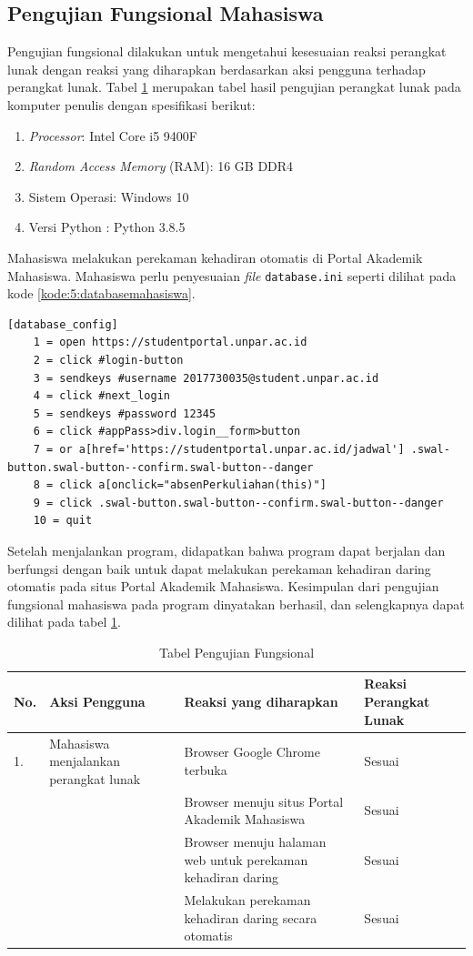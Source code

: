 \subsection{Pengujian Fungsional Mahasiswa}
Pengujian fungsional dilakukan untuk mengetahui kesesuaian reaksi perangkat lunak dengan reaksi yang diharapkan berdasarkan aksi pengguna terhadap perangkat lunak. Tabel \ref{tab:fungsiMahasiswa} merupakan tabel hasil pengujian perangkat lunak pada komputer penulis dengan spesifikasi berikut:
\begin{enumerate}
	\item \textit{Processor}: Intel Core i5 9400F
	\item \textit{Random Access Memory} (RAM): 16 GB DDR4
	\item Sistem Operasi: Windows 10
	\item Versi Python : Python 3.8.5
\end{enumerate}
Mahasiswa melakukan perekaman kehadiran otomatis di Portal Akademik Mahasiswa. Mahasiswa perlu penyesuaian \textit{file} \texttt{database.ini} seperti dilihat pada kode \ref{kode:5:databasemahasiswa}.
\\
\begin{lstlisting}[caption=\textit{File} \texttt{database.ini} Portal Akademik Mahasiswa (\textit{password} disembunyikan), label=kode:5:databasemahasiswa]
	[database_config]
	1 = open https://studentportal.unpar.ac.id
	2 = click #login-button
	3 = sendkeys #username 2017730035@student.unpar.ac.id 
	4 = click #next_login
	5 = sendkeys #password 12345
	6 = click #appPass>div.login__form>button
	7 = or a[href='https://studentportal.unpar.ac.id/jadwal'] .swal-button.swal-button--confirm.swal-button--danger
	8 = click a[onclick="absenPerkuliahan(this)"]
	9 = click .swal-button.swal-button--confirm.swal-button--danger
	10 = quit
\end{lstlisting}


Setelah menjalankan program, didapatkan bahwa program dapat berjalan dan berfungsi dengan baik untuk dapat melakukan perekaman kehadiran daring otomatis pada situs Portal Akademik Mahasiswa. Kesimpulan dari pengujian fungsional mahasiswa pada program dinyatakan berhasil, dan selengkapnya dapat dilihat pada tabel \ref{tab:fungsiMahasiswa}.

\begin{table}[H]			
	\caption{Tabel Pengujian Fungsional}
	\centering
	\begin{tabular}{|p{0.5cm} |p{4cm} |p{5.5cm}| p{3cm}|} \hline
		No. & Aksi Pengguna & Reaksi yang diharapkan & Reaksi Perangkat Lunak\\ \hline     
		1. 	& Mahasiswa menjalankan perangkat lunak & Browser Google Chrome terbuka & Sesuai\\ \hline 
	 		& &  Browser menuju situs Portal Akademik Mahasiswa & Sesuai\\ \hline 
			& &  Browser menuju halaman web untuk perekaman kehadiran daring & Sesuai\\ \hline 
			& &  Melakukan perekaman kehadiran daring secara otomatis & Sesuai\\ \hline
	\end{tabular}
	\label{tab:fungsiMahasiswa}
\end{table}


